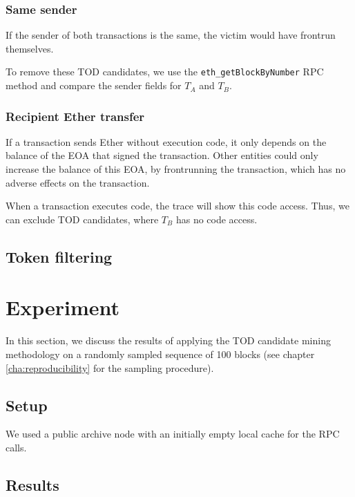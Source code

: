 \documentclass[draft,final]{vutinfth} %
\begin{document}
\subsubsection{Same sender}

If the sender of both transactions is the same, the victim would have frontrun themselves.

To remove these TOD candidates, we use the \verb|eth_getBlockByNumber| RPC method and compare the sender fields for $T_A$ and $T_B$.

\subsubsection{Recipient Ether transfer}

If a transaction sends Ether without execution code, it only depends on the balance of the EOA that signed the transaction. Other entities could only increase the balance of this EOA, by frontrunning the transaction, which has no adverse effects on the transaction.

When a transaction executes code, the trace will show this code access. Thus, we can exclude TOD candidates, where $T_B$ has no code access.

\subsection{Token filtering}


\section{Experiment}

In this section, we discuss the results of applying the TOD candidate mining methodology on a randomly sampled sequence of 100 blocks (see chapter \ref{cha:reproducibility} for the sampling procedure).

\subsection{Setup}

We used a public archive node\cite{noauthor_pokt_2024} with an initially empty local cache for the RPC calls.

\subsection{Results}
\end{document}
